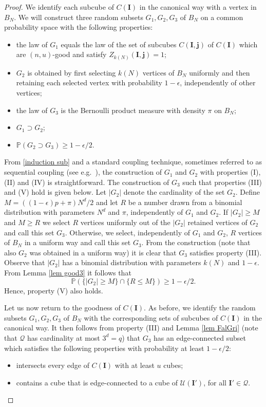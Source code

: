 \documentclass[11pt,a4paper]{article}
\newcommand{\Ib}{\ensuremath{\mathbf{I}}}
\newcommand{\Ij}{\ensuremath{\mathbf{j}}}
\newcommand{\IP}{\ensuremath{\mathbb{P}}}
\newcommand{\QQ}{\ensuremath{\mathcal{Q}}}
\newcommand{\UU}{\ensuremath{\mathcal{U}}}
\theoremstyle{remark}
\begin{document}
\begin{proof}
We identify each subcube of $C(\Ib)$ in the canonical way with a vertex in $B_N$. We will construct three random subsets $G_1, G_2, G_3$ of $B_N$ on a common probability space with the following properties:
\begin{itemize}
\item[(I)] the law of $G_1$ equals the law of the set of subcubes $C(\Ib,\Ij)$ of $C(\Ib)$ which are $(n,u)$-good and satisfy $Z_{k(N)}(\Ib,\Ij)=1$;
\item[(II)] $G_2$ is obtained by first selecting $k(N)$ vertices of $B_N$ uniformly and then retaining each selected vertex with probability $1-\epsilon$, independently of other vertices;
\item[(III)] the law of $G_3$ is the Bernoulli product measure with density $\pi$ on $B_N$;
\item[(IV)] $G_1 \supset G_2$;
\item[(V)] $\IP(G_2 \supset G_3) \geq 1-\epsilon/2$.
\end{itemize}


From \eqref{induction sub} and a standard coupling technique, sometimes referred to as sequential coupling (see e.g.\ \cite{LigSte}), the construction of $G_1$ and $G_2$ with properties (I), (II) and (IV) is straightforward. The construction of $G_3$ such that properties (III) and (V) hold is given below. Let $|G_2|$ denote the cardinality of the set $G_2$. Define $M=((1-\epsilon)p+\pi)N^d / 2$ and let $R$ be a number drawn from a binomial distribution with parameters $N^d$ and $\pi$, independently of $G_1$ and $G_2$. If $|G_2| \geq M$ and $M\geq R$ we select $R$ vertices uniformly  out of the $|G_2|$ retained vertices of $G_2$ and call this set $G_3$. Otherwise, we select, independently of $G_1$ and $G_2$, $R$ vertices of $B_N$ in a uniform way and call this set $G_3$. From the construction (note that also $G_2$ was obtained in a uniform way) it is clear that $G_3$ satisfies property (III). Observe that $|G_2|$ has a binomial distribution with parameters $k(N)$ and $1-\epsilon$. From Lemma \ref{lem good3} it follows that
\[
 \IP(\{|G_2| \geq M \} \cap \{R \leq M\}) \geq 1-\epsilon/2.
\]
Hence, property (V) also holds.


Let us now return to the goodness of $C(\Ib)$. As before, we identify the random subsets $G_1,G_2,G_3$ of $B_N$ with
the corresponding sets of subcubes  of $C(\Ib)$ in the canonical way. It then follows from property (III) and Lemma \ref{lem FalGri} (note that $\QQ$ has cardinality at most $3^d =q$) that $G_3$ has an edge-connected subset which satisfies the following properties with probability at least $1-\epsilon/2$:
\begin{itemize}
  \item[(i)] intersects every edge of $C(\Ib)$ with at least $u$ cubes;
 \item[(ii)] contains a cube that is edge-connected to a cube of $\UU(\Ib')$, for all $\Ib' \in \QQ$. 
 \end{itemize}



\end{proof}
\end{document}
